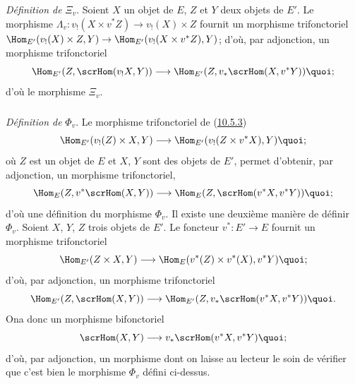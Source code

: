 \documentclass[10pt]{../fichiers-configuration-latex/smfart}
\begin{document}
\subsubsection{}
\emph{Définition de} $\Xi_v$. Soient $X$ un objet de $E$, $Z$ et $Y$
deux objets de $E'$. Le morphisme $\Lambda_v:v_{!}(X\times
v^{\ast}Z)\rightarrow v_{!}(X)\times Z$ fournit un morphisme
trifonctoriel $\Hom_{E'}(v_{!}(X)\times Z,Y)\rightarrow
\Hom_{E'}(v_{!}(X\times v^{\ast}Z),Y)$; d'où, par adjonction, un
morphisme trifonctoriel
$$
\Hom_{E'}(Z,\scrHom(v_{!}X,Y))\longrightarrow
\Hom_{E'}(Z,v_{\ast}\scrHom(X,v^{\ast}Y)){\quoi};
$$
d'où le morphisme $\Xi_v$.

\subsubsection{}
\emph{Définition de} $\Phi_v$. Le morphisme trifonctoriel de
(\hyperref[IV.subsubsec10.5.3]{10.5.3})
$$
\Hom_{E'}(v_{!}(Z)\times X,Y)\longrightarrow \Hom_{E'}(v_{!}(Z\times
v^{\ast}X),Y){\quoi};
$$
où $Z$ est un objet de $E$ et $X$, $Y$ sont des objets de $E'$,
permet d'obtenir, par adjonction, un morphisme trifonctoriel,
$$
\Hom_E(Z,v^{\ast}\scrHom(X,Y))\longrightarrow
\Hom_E(Z,\scrHom(v^{\ast}X, v^{\ast}Y)){\quoi};
$$
d'où une définition du morphisme $\Phi_v$. Il existe une deuxième
manière de définir $\Phi_v$. Soient $X$, $Y$, $Z$ trois objets de
$E'$. Le foncteur $v^{\ast}:E'\rightarrow E$ fournit un morphisme
trifonctoriel
$$
\Hom_{E'}(Z\times X,Y)\longrightarrow \Hom_E (v^{\ast}(Z)\times
v^{\ast}(X), v^{\ast}Y){\quoi};
$$
d'où, par adjonction, un morphisme trifonctoriel
$$
\Hom_{E'}(Z,\scrHom(X,Y))\longrightarrow
\Hom_{E'}(Z,v_{\ast}\scrHom(v^{\ast}X, v^{\ast}Y)){\quoi}.
$$
On\pageoriginale a donc un morphisme bifonctoriel
$$
\scrHom(X,Y)\longrightarrow v_{\ast}\scrHom(v^{\ast}X,
v^{\ast}Y){\quoi};
$$
d'où, par adjonction, un morphisme dont on laisse au lecteur le soin
de vérifier que c'est bien le morphisme $\Phi_v$ défini ci-dessus.
\end{document}
